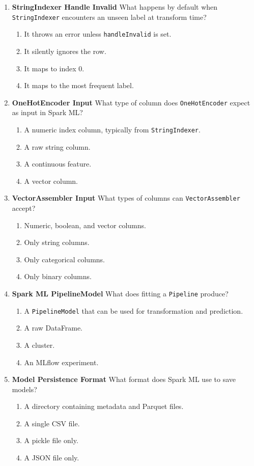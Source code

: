 \documentclass{article}
\begin{document}
\begin{enumerate}[label=\textbf{Q\arabic*.}]
		\item \textbf{StringIndexer Handle Invalid}
		What happens by default when \texttt{StringIndexer} encounters an unseen label at transform time?
		\begin{enumerate}[label=\Alph*.]
			\item It throws an error unless \texttt{handleInvalid} is set.
			\item It silently ignores the row.
			\item It maps to index 0.
			\item It maps to the most frequent label.
		\end{enumerate}
		
		\item \textbf{OneHotEncoder Input}
		What type of column does \texttt{OneHotEncoder} expect as input in Spark ML?
		\begin{enumerate}[label=\Alph*.]
			\item A numeric index column, typically from \texttt{StringIndexer}.
			\item A raw string column.
			\item A continuous feature.
			\item A vector column.
		\end{enumerate}
		
		\item \textbf{VectorAssembler Input}
		What types of columns can \texttt{VectorAssembler} accept?
		\begin{enumerate}[label=\Alph*.]
			\item Numeric, boolean, and vector columns.
			\item Only string columns.
			\item Only categorical columns.
			\item Only binary columns.
		\end{enumerate}
		
		\item \textbf{Spark ML PipelineModel}
		What does fitting a \texttt{Pipeline} produce?
		\begin{enumerate}[label=\Alph*.]
			\item A \texttt{PipelineModel} that can be used for transformation and prediction.
			\item A raw DataFrame.
			\item A cluster.
			\item An MLflow experiment.
		\end{enumerate}
		
		\item \textbf{Model Persistence Format}
		What format does Spark ML use to save models?
		\begin{enumerate}[label=\Alph*.]
			\item A directory containing metadata and Parquet files.
			\item A single CSV file.
			\item A pickle file only.
			\item A JSON file only.
		\end{enumerate}
		

\end{enumerate}
\end{document}
